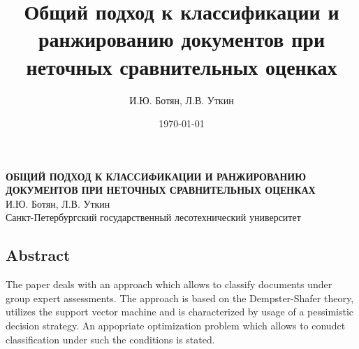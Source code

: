 \documentclass[12pt,a4paper,oneside]{article}
\title{Общий подход к классификации и ранжированию документов при неточных сравнительных оценках}
\author{И.Ю. Ботян, Л.В. Уткин}
\date{\today}
\begin{document}



\begin{center}
\textbf{ОБЩИЙ ПОДХОД К КЛАССИФИКАЦИИ И РАНЖИРОВАНИЮ ДОКУМЕНТОВ ПРИ НЕТОЧНЫХ СРАВНИТЕЛЬНЫХ ОЦЕНКАХ}\\
\vspace*{1em}
И.Ю. Ботян, Л.В. Уткин\\
\vspace*{1em}
Санкт-Петербургский государственный лесотехнический университет\\
\vspace*{1em}
\end{center}


\begin{footnotesize}
\chapter{Abstract} \nolinebreak
The paper deals with an approach which allows to classify documents under group expert assessments. The approach is based on the Dempster-Shafer theory, utilizes the support vector machine and is characterized by usage of a pessimistic decision strategy. An appopriate optimization problem which allows to conudct classification under such the conditions is stated. 
\end{footnotesize}

\end{document}
